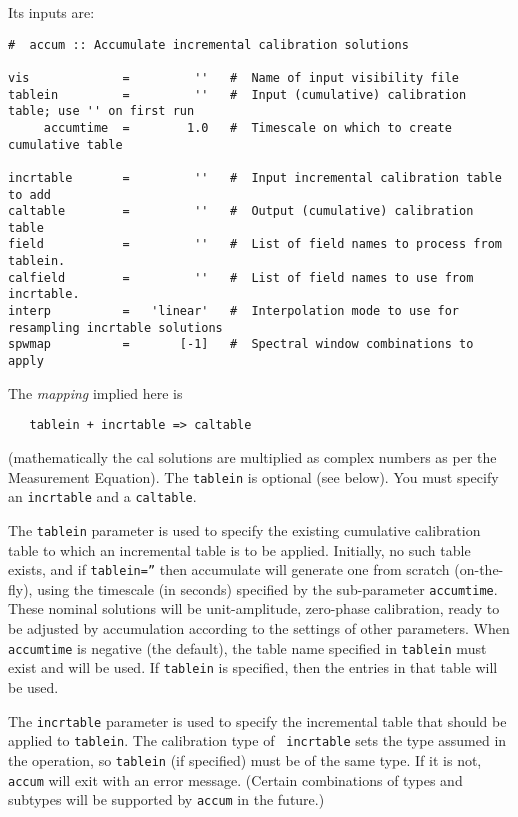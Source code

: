{Its inputs are:
\small
\begin{verbatim}
#  accum :: Accumulate incremental calibration solutions

vis             =         ''   #  Name of input visibility file
tablein         =         ''   #  Input (cumulative) calibration table; use '' on first run
     accumtime  =        1.0   #  Timescale on which to create cumulative table

incrtable       =         ''   #  Input incremental calibration table to add
caltable        =         ''   #  Output (cumulative) calibration table
field           =         ''   #  List of field names to process from tablein.
calfield        =         ''   #  List of field names to use from incrtable.
interp          =   'linear'   #  Interpolation mode to use for resampling incrtable solutions
spwmap          =       [-1]   #  Spectral window combinations to apply
\end{verbatim}
\normalsize
The {\it mapping} implied here is 
\small
\begin{verbatim}
   tablein + incrtable => caltable
\end{verbatim}
\normalsize
(mathematically the cal solutions are multiplied as complex numbers
as per the Measurement Equation).
The {\tt tablein} is optional (see below).
You must specify an {\tt incrtable} and a {\tt caltable}.

The {\tt tablein} parameter is used to specify the existing cumulative
calibration table to which an incremental table is to be applied.
Initially, no such table exists, and if {\tt tablein=''} then
accumulate will generate one from
scratch (on-the-fly), using the timescale (in seconds) specified by
the sub-parameter {\tt accumtime}. These nominal solutions will be
unit-amplitude, zero-phase calibration, ready to
be adjusted by accumulation according to the settings of other
parameters.  When {\tt accumtime} is negative (the default), the table
name specified in {\tt tablein} must exist and will be used.  If 
{\tt tablein} is specified, then the entries in that
table will be used.

The {\tt incrtable} parameter is used to specify the incremental table
that should be applied to {\tt tablein}. The calibration type of {\tt
incrtable} sets the type assumed in the operation, so {\tt tablein}
(if specified) must be of the same type. If it is not, {\tt accum}
will exit with an error message. (Certain combinations of types and
subtypes will be supported by {\tt accum} in the future.)

}
